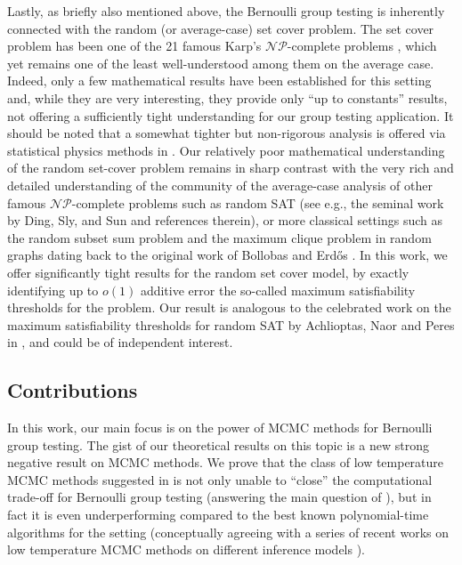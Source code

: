 \documentclass[12pt,reqno]{amsart}
\numberwithin{equation}{section}
\theoremstyle{definition}
\renewcommand{\[}{\begin{equation}}
\renewcommand{\]}{\end{equation}}
\renewcommand{\|}{\bigg{|}}
\begin{document}
Lastly, as briefly also mentioned above, the Bernoulli group testing is inherently connected with the random (or average-case) set cover problem. The set cover problem has been one of the 21 famous Karp's $\mathcal{NP}$-complete problems \cite{karp2010reducibility}, which yet remains one of the least well-understood among them on the average case. Indeed, only a few mathematical results have been established for this setting \cite{telelis2005absolute, arpino2023greedy} and, while they are very interesting, they provide only ``up to constants'' results, not offering a sufficiently tight understanding for our group testing application. It should be noted that a somewhat tighter but non-rigorous analysis is offered via statistical physics methods in \cite{mezard2007statistical}. Our relatively poor mathematical understanding of the random set-cover problem remains in sharp contrast with the very rich and detailed understanding of the community of the average-case analysis of other famous $\mathcal{NP}$-complete problems such as random SAT (see e.g., the seminal work by Ding, Sly, and Sun \cite{Ding_sat} and references therein), or more classical settings such as the random subset sum problem \cite{lagarias1985solving, frieze1986lagarias} and the maximum clique problem in random graphs dating back to the original work of Bollobas and Erd\H{o}s \cite{bollobas1976cliques}. In this work, we offer significantly tight results for the random set cover model, by exactly identifying up to $o(1)$ additive error the so-called maximum satisfiability thresholds for the problem. Our result is analogous to the celebrated work on the maximum satisfiability thresholds for random SAT by Achlioptas, Naor and Peres in \cite{achlioptas2007maximum}, and could be of independent interest.
 

\subsection{Contributions}

In this work, our main focus is on the power of MCMC methods for Bernoulli group testing. The gist of our theoretical results on this topic is a new strong negative result on MCMC methods. We prove that the class of low temperature MCMC methods suggested in  \cite{iliopoulos2021group} is not only unable to ``close'' the computational trade-off for Bernoulli group testing (answering the main question of \cite{iliopoulos2021group}), but in fact it is even underperforming compared to the best known polynomial-time algorithms for the setting (conceptually agreeing with a series of recent works on low temperature MCMC methods on different inference models \cite{chen2023almost, chen2024low}). 
\end{document}

